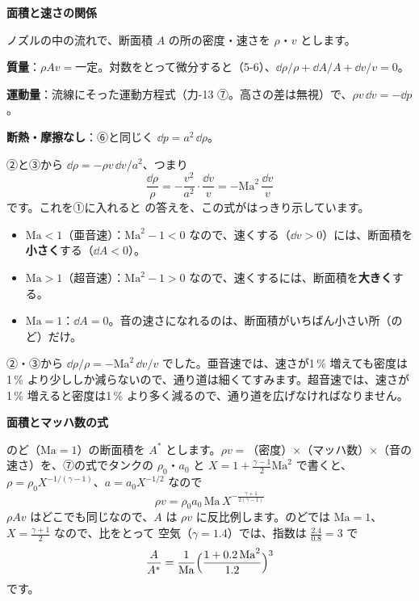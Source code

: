 \noindent\textbf{面積と速さの関係}\par\nobreak
ノズルの中の流れで、断面積 $A$ の所の密度・速さを $\rho$・$v$ とします。
\begin{enumerate}[label={\bkcircled[bkBlue]{\arabic*}}, leftmargin=2.4\zw, itemsep=2pt, topsep=2pt]
\item \textbf{質量}：$\rho Av=$一定。対数をとって微分すると（5-6）、$\dd\rho/\rho+\dd A/A+\dd v/v=0$。
\item \textbf{運動量}：流線にそった運動方程式（力-13 ⑦。高さの差は無視）で、$\rho v\,\dd v=-\dd p$。
\item \textbf{断熱・摩擦なし}：⑥と同じく $\dd p=a^2\,\dd\rho$。
\end{enumerate}
②と③から $\dd\rho=-\rho v\,\dd v/a^2$、つまり
\[ \frac{\dd\rho}{\rho}=-\frac{v^2}{a^2}\cdot\frac{\dd v}{v}=-\mathrm{Ma}^2\,\frac{\dd v}{v} \]
です。これを①に入れると
\label{ph:熱-4:areavel}\bkhatenaref の答えを、この式がはっきり示しています。
\begin{itemize}[leftmargin=1.2\zw, itemsep=2pt, topsep=2pt, label={\color{bkTheme}●}]
\item $\mathrm{Ma}<1$（亜音速）：$\mathrm{Ma}^2-1<0$ なので、速くする（$\dd v>0$）には、断面積を\textbf{小さく}する（$\dd A<0$）。
\item $\mathrm{Ma}>1$（超音速）：$\mathrm{Ma}^2-1>0$ なので、速くするには、断面積を\textbf{大きく}する。
\item $\mathrm{Ma}=1$：$\dd A=0$。音の速さになれるのは、断面積がいちばん小さい所（のど）だけ。
\end{itemize}
②・③から $\dd\rho/\rho=-\mathrm{Ma}^2\,\dd v/v$ でした。亜音速では、速さが1\,\% 増えても密度は1\,\% より少ししか減らないので、通り道は細くてすみます。超音速では、速さが1\,\% 増えると密度は1\,\% より多く減るので、通り道を広げなければなりません。

\noindent\textbf{面積とマッハ数の式}\par\nobreak
のど（$\mathrm{Ma}=1$）の断面積を $A^*$ とします。$\rho v=$（密度）×（マッハ数）×（音の速さ）を、⑦の式でタンクの $\rho_0$・$a_0$ と $X=1+\tfrac{\gamma-1}{2}\mathrm{Ma}^2$ で書くと、$\rho=\rho_0X^{-1/(\gamma-1)}$、$a=a_0X^{-1/2}$ なので
\[ \rho v=\rho_0a_0\,\mathrm{Ma}\,X^{-\frac{\gamma+1}{2(\gamma-1)}} \]
$\rho Av$ はどこでも同じなので、$A$ は $\rho v$ に反比例します。のどでは $\mathrm{Ma}=1$、$X=\tfrac{\gamma+1}{2}$ なので、比をとって
空気（$\gamma=1.4$）では、指数は $\tfrac{2.4}{0.8}=3$ で
\[ \frac{A}{A^*}=\frac{1}{\mathrm{Ma}}\Bigl(\frac{1+0.2\,\mathrm{Ma}^2}{1.2}\Bigr)^3 \]
です。

